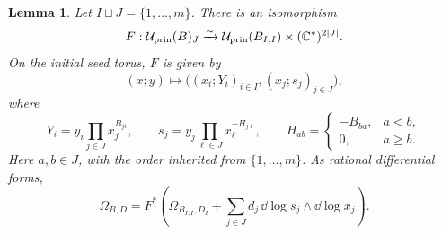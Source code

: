 \documentclass[12pt, letter]{amsart}
\newtheorem{lemma}[theorem]{Lemma}
\theoremstyle{definition}
\newcommand{\pr}{\mathrm{prin}}
\numberwithin{equation}{section}
\begin{document}
\begin{lemma}\label{lem:principal-product}
Let $I\sqcup J=\{1,\ldots,m\}$.
There is an isomorphism
\begin{equation}\label{eq:principal-product}
 F:\mathcal{U}_{\pr}(B)_{J}
 \xrightarrow{\sim}\mathcal{U}_{\pr}(B_{I,I})\times(\C^*)^{2|J|}.
\end{equation}
On the initial seed torus, $F$ is given by
\[
 (x;y)\longmapsto
 \bigl((x_i;Y_i)_{i\in I},(x_j;s_j)_{j\in J}\bigr),
\]
where
\begin{equation}\label{eq:principal-freezing-coordinates}
 Y_i=y_i\prod_{j\in J}x_j^{B_{ji}},\qquad
 s_j=y_j\prod_{\ell\in J}x_\ell^{-H_{j\ell}},\qquad
 H_{ab}=\begin{cases}-B_{ba},&a<b,\\0,&a\ge b.\end{cases}
\end{equation}
Here $a,b\in J$, with the order inherited from $\{1,\ldots,m\}$.
As rational differential forms,
\begin{equation}\label{eq:product-omega}
 \Omega_{B,D}
 =F^*\left(\Omega_{B_{I,I},D_I}
       +\sum_{j\in J}d_j\,\dd\log s_j\wedge\dd\log x_j\right).
\end{equation}
\end{lemma}
\end{document}
